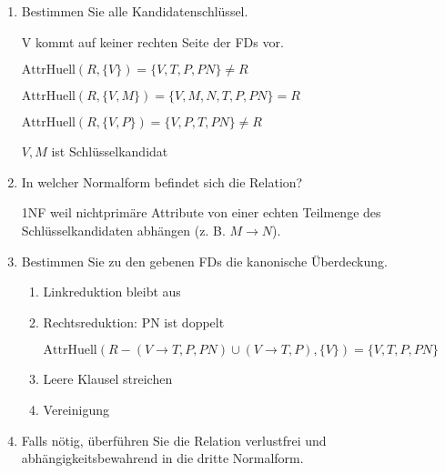 \documentclass{lehramt-informatik}
\begin{document}
\begin{enumerate}
\item Bestimmen Sie alle Kandidatenschlüssel.

\begin{antwort}
V kommt auf keiner rechten Seite der FDs vor.

$\text{AttrHuell}(R, \{V\}) = \{V, T, P, PN\} \neq  R$

$\text{AttrHuell}(R, \{V, M\}) = \{V, M, N, T, P, PN\} = R$

$\text{AttrHuell}(R, \{V, P\}) = \{V, P, T, PN\} \neq R$

$V, M$ ist Schlüsselkandidat
\end{antwort}

\item In welcher Normalform befindet sich die Relation?

\begin{antwort}
1NF weil nichtprimäre Attribute von einer echten Teilmenge des
Schlüsselkandidaten abhängen (z. B. $M \rightarrow N$).
\end{antwort}

\item Bestimmen Sie zu den gebenen FDs die kanonische Überdeckung.

\begin{antwort}

\begin{enumerate}
\item Linkreduktion bleibt aus

\item Rechtsreduktion: PN ist doppelt

$\text{AttrHuell}(R - (V \rightarrow T, P, PN) \cup (V \rightarrow T, P), \{V\}) = \{V, T, P, PN\}$

\item Leere Klausel streichen

\item Vereinigung


\end{enumerate}

\end{antwort}

\item Falls nötig, überführen Sie die Relation verlustfrei und
abhängigkeitsbewahrend in die dritte Normalform.
\end{enumerate}

\literatur
\end{document}
